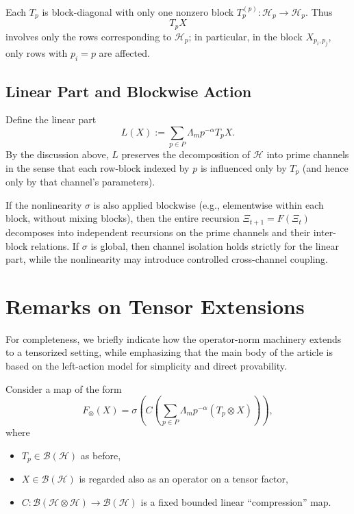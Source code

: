 \documentclass[12pt]{article}
\begin{document}
Each \(T_p\) is block-diagonal with only one nonzero block \(T_p^{(p)}:\mathcal{H}_p\to\mathcal{H}_p\). Thus
\[
  T_p X
\]
involves only the rows corresponding to \(\mathcal{H}_p\); in particular, in the block \(X_{p_i,p_j}\), only rows with \(p_i=p\) are affected.

\subsection{Linear Part and Blockwise Action}

Define the linear part
\[
  L(X) := \sum_{p\in P} \Lambda_m p^{-\alpha} T_p X.
\]
By the discussion above, \(L\) preserves the decomposition of \(\mathcal{H}\) into prime channels in the sense that each row-block indexed by \(p\) is influenced only by \(T_p\) (and hence only by that channel's parameters).

If the nonlinearity \(\sigma\) is also applied blockwise (e.g., elementwise within each block, without mixing blocks), then the entire recursion \(\Xi_{t+1} = F(\Xi_t)\) decomposes into independent recursions on the prime channels and their inter-block relations. If \(\sigma\) is global, then channel isolation holds strictly for the linear part, while the nonlinearity may introduce controlled cross-channel coupling.

\section{Remarks on Tensor Extensions}
\label{sec:appendix-tensor}

For completeness, we briefly indicate how the operator-norm machinery extends to a tensorized setting, while emphasizing that the main body of the article is based on the left-action model for simplicity and direct provability.

Consider a map of the form
\[
  F_{\otimes}(X) = \sigma\!\left( C\!\left( \sum_{p\in P} \Lambda_m p^{-\alpha} (T_p \otimes X) \right)\right),
\]
where
\begin{itemize}
  \item \(T_p\in\mathcal{B}(\mathcal{H})\) as before,
  \item \(X\in\mathcal{B}(\mathcal{H})\) is regarded also as an operator on a tensor factor,
  \item \(C:\mathcal{B}(\mathcal{H}\otimes\mathcal{H})\to\mathcal{B}(\mathcal{H})\) is a fixed bounded linear ``compression'' map.
\end{itemize}
\end{document}
